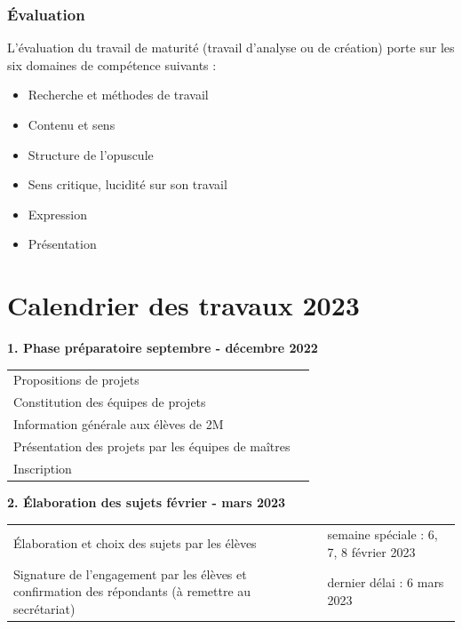 \documentclass[
  10pt,
  french,
  a5paper,
  openany]{book}
\providecommand{\tightlist}{%
  \setlength{\itemsep}{0pt}\setlength{\parskip}{0pt}}
\begin{document}
\hypertarget{uxe9valuation-1}{%
\subsection*{Évaluation}\label{uxe9valuation-1}}

L'évaluation du travail de maturité (travail d'analyse ou de création) porte sur les six domaines de compétence suivants :

\begin{itemize}
\tightlist
\item
  Recherche et méthodes de travail
\item
  Contenu et sens
\item
  Structure de l'opuscule
\item
  Sens critique, lucidité sur son travail
\item
  Expression
\item
  Présentation
\end{itemize}

\hypertarget{calendrier-des-travaux-2023}{%
\chapter*{Calendrier des travaux 2023}\label{calendrier-des-travaux-2023}}


\textbf{1. Phase préparatoire \hfill septembre - décembre 2022}

\begin{longtable}[]{@{}ll@{}}
\toprule
\endhead
Propositions de projets &\tabularnewline
Constitution des équipes de projets &\tabularnewline
Information générale aux élèves de 2M &\tabularnewline
Présentation des projets par les équipes de maîtres &\tabularnewline
Inscription &\tabularnewline
\bottomrule
\end{longtable}


\textbf{2. Élaboration des sujets \hfill février - mars 2023}

\begin{longtable}[]{@{}ll@{}}
\toprule
\endhead
\begin{minipage}[t]{0.65\columnwidth}\raggedright
Élaboration et choix des sujets par les élèves\strut
\end{minipage} & \begin{minipage}[t]{0.29\columnwidth}\raggedright
semaine spéciale : 6, 7, 8 février 2023\strut
\end{minipage}\tabularnewline
\begin{minipage}[t]{0.65\columnwidth}\raggedright
Signature de l'engagement par les élèves et confirmation des répondants (à remettre au secrétariat)\strut
\end{minipage} & \begin{minipage}[t]{0.29\columnwidth}\raggedright
dernier délai : 6 mars 2023\strut
\end{minipage}\tabularnewline
\bottomrule
\end{longtable}
\end{document}
